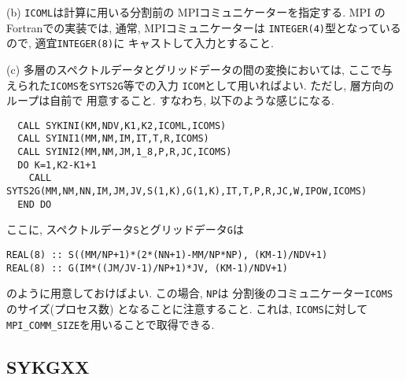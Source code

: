 \documentclass[a4j]{jsarticle}
\begin{document}
\begin{enumerate}
(b) \texttt{ICOML}は計算に用いる分割前の MPIコミュニケーターを指定する.
 MPI の Fortranでの実装では, 通常, MPIコミュニケーターは
 \texttt{INTEGER(4)}型となっているので, 適宜\texttt{INTEGER(8)}に
キャストして入力とすること.

(c) 多層のスペクトルデータとグリッドデータの間の変換においては,
ここで与えられた\texttt{ICOMS}を\texttt{SYTS2G}等での入力
\texttt{ICOM}として用いればよい. ただし, 層方向のループは自前で
用意すること. すなわち, 以下のような感じになる.

\begin{verbatim}  
  CALL SYKINI(KM,NDV,K1,K2,ICOML,ICOMS)
  CALL SYINI1(MM,NM,IM,IT,T,R,ICOMS)
  CALL SYINI2(MM,NM,JM,1_8,P,R,JC,ICOMS)
  DO K=1,K2-K1+1
    CALL SYTS2G(MM,NM,NN,IM,JM,JV,S(1,K),G(1,K),IT,T,P,R,JC,W,IPOW,ICOMS)
  END DO
\end{verbatim}  
ここに, スペクトルデータ\texttt{S}とグリッドデータ\texttt{G}は
\begin{verbatim}        
REAL(8) :: S((MM/NP+1)*(2*(NN+1)-MM/NP*NP), (KM-1)/NDV+1)
REAL(8) :: G(IM*((JM/JV-1)/NP+1)*JV, (KM-1)/NDV+1)
\end{verbatim}      
のように用意しておけばよい. この場合, \texttt{NP}は
分割後のコミュニケーター\texttt{ICOMS}のサイズ(プロセス数)
となることに注意すること. これは, \texttt{ICOMS}に対して
\texttt{MPI\_COMM\_SIZE}を用いることで取得できる.
\end{enumerate}


\subsection{SYKGXX}
\end{document}
